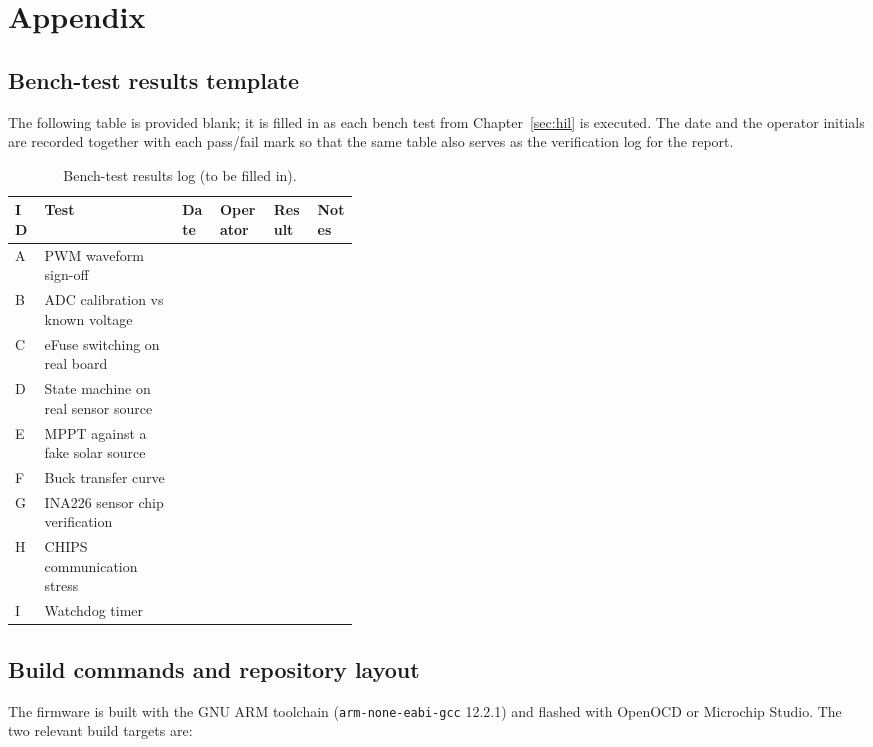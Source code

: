 \section{Appendix}

\subsection{Bench-test results template}

The following table is provided blank; it is filled in as each
bench test from Chapter~\ref{sec:hil} is executed. The
date and the operator initials are recorded together with each
pass/fail mark so that the same table also serves as the
verification log for the report.

\begin{table}[ht]
\centering
\caption{Bench-test results log (to be filled in).}
\small
\begin{tabular}{@{}lp{0.4\linewidth}llll@{}}
\toprule
\textbf{ID} & \textbf{Test} & \textbf{Date} & \textbf{Operator} & \textbf{Result} & \textbf{Notes} \\
\midrule
A & PWM waveform sign-off               &  &  &  &  \\
B & ADC calibration vs known voltage    &  &  &  &  \\
C & eFuse switching on real board       &  &  &  &  \\
D & State machine on real sensor source &  &  &  &  \\
E & MPPT against a fake solar source    &  &  &  &  \\
F & Buck transfer curve                 &  &  &  &  \\
G & INA226 sensor chip verification     &  &  &  &  \\
H & CHIPS communication stress          &  &  &  &  \\
I & Watchdog timer                      &  &  &  &  \\
\bottomrule
\end{tabular}
\end{table}

\subsection{Build commands and repository layout}

The firmware is built with the GNU ARM toolchain
(\texttt{arm-none-eabi-gcc} 12.2.1) and flashed with OpenOCD
or Microchip Studio. The two relevant build targets are:

